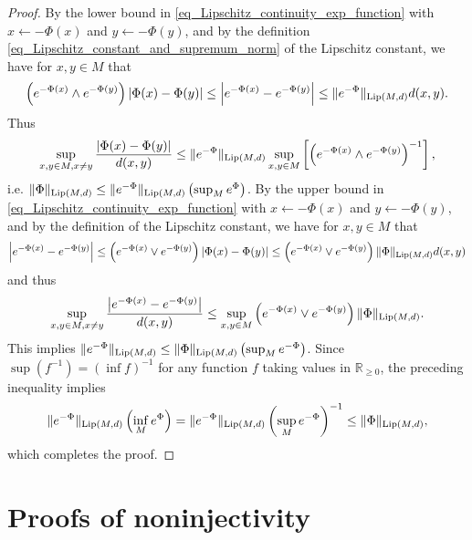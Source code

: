 \documentclass[a4paper]{scrartcl}
\theoremstyle{definition}
\numberwithin{equation}{section}
\newcommand{\R}{\mathbb{R}}
\newcommand{\Abs}[1]{\left\vert#1\right\vert}
\newcommand{\norm}[1]{\Vert #1 \Vert}
\newcommand{\Lip}[0]{\textup{Lip}}
\begin{document}
\begin{proof}
By the lower bound in \eqref{eq_Lipschitz_continuity_exp_function} with $x\leftarrow -\Phi(x)$ and $y\leftarrow -\Phi(y)$, and by the definition \eqref{eq_Lipschitz_constant_and_supremum_norm} of the Lipschitz constant, we have for $x,y\in M$ that
 \begin{equation*}
  \left(e^{-\Phi(x)}\wedge e^{-\Phi(y)}\right)\Abs{\Phi(x)-\Phi(y)}\leq \Abs{e^{-\Phi(x)}-e^{-\Phi(y)}}\leq \norm{e^{-\Phi}}_{\Lip(M,d)}d(x,y).
 \end{equation*}
Thus
\begin{equation*}
 \sup_{x,y\in M,x\neq y} \frac{\Abs{\Phi(x)-\Phi(y)}}{d(x,y)}\leq \norm{e^{-\Phi}}_{\Lip(M,d)} \sup_{x,y\in M}\left[\left(e^{-\Phi(x)}\wedge e^{-\Phi(y)}\right)^{-1}\right],
\end{equation*}
i.e. $\norm{\Phi}_{\Lip(M,d)}\leq \norm{e^{-\Phi}}_{\Lip(M,d)} \left(\sup_{M}e^{\Phi}\right)$.
By the upper bound in \eqref{eq_Lipschitz_continuity_exp_function} with $x\leftarrow -\Phi(x)$ and $y\leftarrow -\Phi(y)$, and by the definition of the Lipschitz constant, we have for $x,y\in M$ that
\begin{equation*}
  \Abs{e^{-\Phi(x)}-e^{-\Phi(y)}}\leq \left(e^{-\Phi(x)}\vee e^{-\Phi(y)}\right)\Abs{\Phi(x)-\Phi(y)}\leq \left(e^{-\Phi(x)}\vee e^{-\Phi(y)}\right)\norm{\Phi}_{\Lip(M,d)}d(x,y)
 \end{equation*}
and thus 
\begin{equation*}
\sup_{x,y\in M, x\neq y}\frac{\Abs{e^{-\Phi(x)}-e^{-\Phi(y)}}}{d(x,y)}\leq \sup_{x,y\in M} \left(e^{-\Phi(x)}\vee e^{-\Phi(y)}\right)\norm{\Phi}_{\Lip(M,d)}.
\end{equation*}
This implies $\norm{e^{-\Phi}}_{\Lip(M,d)}\leq \norm{\Phi}_{\Lip(M,d)}\left( \sup_M e^{-\Phi}\right)$. Since $\sup(f^{-1})=(\inf f)^{-1}$ for any function $f$ taking values in $\R_{\geq 0}$, the preceding inequality implies
\begin{equation*}
 \norm{e^{-\Phi}}_{\Lip(M,d)}\left( \inf_M e^{\Phi}\right)=\norm{e^{-\Phi}}_{\Lip(M,d)}\left( \sup_M e^{-\Phi}\right)^{-1}\leq \norm{\Phi}_{\Lip(M,d)},
\end{equation*}
which completes the proof.
\end{proof}

\section{Proofs of noninjectivity}
\label{section_noninjectivity_proofs}
\end{document}

